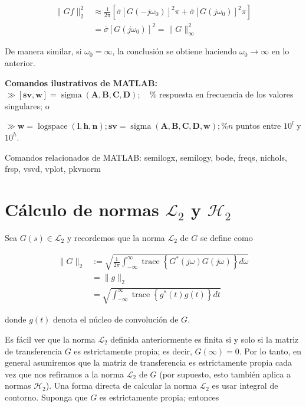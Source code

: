 $$
\begin{aligned}
\|G f\|_{2}^{2} & \approx \frac{1}{2 \pi}\left[\bar{\sigma}\left[G\left(-j \omega_{0}\right)\right]^{2} \pi+\bar{\sigma}\left[G\left(j \omega_{0}\right)\right]^{2} \pi\right] \\
& =\bar{\sigma}\left[G\left(j \omega_{0}\right)\right]^{2}=\|G\|_{\infty}^{2}
\end{aligned}
$$

De manera similar, si $\omega_{0}=\infty$, la conclusión se obtiene haciendo $\omega_{0} \rightarrow \infty$ en lo anterior.

\textbf{Comandos ilustrativos de MATLAB:}
$\gg[\mathbf{s v}, \mathbf{w}]=\operatorname{sigma}(\mathbf{A}, \mathbf{B}, \mathbf{C}, \mathbf{D}) ; \quad \%$ respuesta en frecuencia de los valores singulares; o

$\gg \mathbf{w}=\operatorname{logspace}(\mathbf{l}, \mathbf{h}, \mathbf{n}) ; \mathbf{s v}=\operatorname{sigma}(\mathbf{A}, \mathbf{B}, \mathbf{C}, \mathbf{D}, \mathbf{w}) ; \% n$ puntos entre $10^{l}$ y $10^{h}$.

Comandos relacionados de MATLAB: semilogx, semilogy, bode, freqs, nichols, frsp, vsvd, vplot, pkvnorm

\section{Cálculo de normas $\mathcal{L}_{2}$ y $\mathcal{H}_{2}$}
Sea $G(s) \in \mathcal{L}_{2}$ y recordemos que la norma $\mathcal{L}_{2}$ de $G$ se define como

$$
\begin{aligned}
\|G\|_{2} & :=\sqrt{\frac{1}{2 \pi} \int_{-\infty}^{\infty} \operatorname{trace}\left\{G^{*}(j \omega) G(j \omega)\right\} d \omega} \\
& =\|g\|_{2} \\
& =\sqrt{\int_{-\infty}^{\infty} \operatorname{trace}\left\{g^{*}(t) g(t)\right\} d t}
\end{aligned}
$$

donde $g(t)$ denota el núcleo de convolución de $G$.

Es fácil ver que la norma $\mathcal{L}_{2}$ definida anteriormente es finita si y solo si la matriz de transferencia $G$ es estrictamente propia; es decir, $G(\infty)=0$. Por lo tanto, en general asumiremos que la matriz de transferencia es estrictamente propia cada vez que nos refiramos a la norma $\mathcal{L}_{2}$ de $G$ (por supuesto, esto también aplica a normas $\mathcal{H}_{2}$). Una forma directa de calcular la norma $\mathcal{L}_{2}$ es usar integral de contorno. Suponga que $G$ es estrictamente propia; entonces

